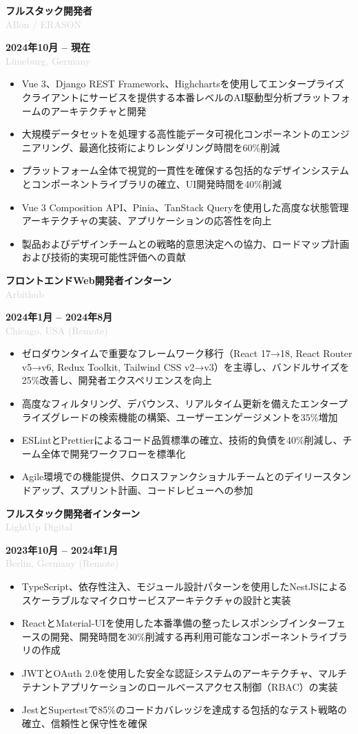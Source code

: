\documentclass[10pt,a4paper]{article}
\newcommand{\Experience}[4]{%
  \vspace{2pt}
  \noindent
  \begin{minipage}[t]{0.70\textwidth}
    {\normalsize\textbf{\color{darkgray}#3}} \\
    \textcolor{lightgray}{\small #1}
  \end{minipage}%
  \hfill
  \begin{minipage}[t]{0.28\textwidth}
    \raggedleft
    \textcolor{mediumgray}{\small\textbf{#4}} \\
    \textcolor{lightgray}{\small #2}
  \end{minipage}
  \vspace{1pt}
}
\begin{document}
\Experience{AIlon / ERASON}{Lüneburg, Germany}{フルスタック開発者}{2024年10月 -- 現在}
\begin{itemize}
  \item Vue 3、Django REST Framework、Highchartsを使用してエンタープライズクライアントにサービスを提供する本番レベルのAI駆動型分析プラットフォームのアーキテクチャと開発
  \item 大規模データセットを処理する高性能データ可視化コンポーネントのエンジニアリング、最適化技術によりレンダリング時間を60\%削減
  \item プラットフォーム全体で視覚的一貫性を確保する包括的なデザインシステムとコンポーネントライブラリの確立、UI開発時間を40\%削減
  \item Vue 3 Composition API、Pinia、TanStack Queryを使用した高度な状態管理アーキテクチャの実装、アプリケーションの応答性を向上
  \item 製品およびデザインチームとの戦略的意思決定への協力、ロードマップ計画および技術的実現可能性評価への貢献
\end{itemize}

\Experience{Arbithub}{Chicago, USA (Remote)}{フロントエンドWeb開発者インターン}{2024年1月 -- 2024年8月}
\begin{itemize}
  \item ゼロダウンタイムで重要なフレームワーク移行（React 17→18, React Router v5→v6, Redux Toolkit, Tailwind CSS v2→v3）を主導し、バンドルサイズを25\%改善し、開発者エクスペリエンスを向上
  \item 高度なフィルタリング、デバウンス、リアルタイム更新を備えたエンタープライズグレードの検索機能の構築、ユーザーエンゲージメントを35\%増加
  \item ESLintとPrettierによるコード品質標準の確立、技術的負債を40\%削減し、チーム全体で開発ワークフローを標準化
  \item Agile環境での機能提供、クロスファンクショナルチームとのデイリースタンドアップ、スプリント計画、コードレビューへの参加
\end{itemize}

\Experience{LightUp Digital}{Berlin, Germany (Remote)}{フルスタック開発者インターン}{2023年10月 -- 2024年1月}
\begin{itemize}
  \item TypeScript、依存性注入、モジュール設計パターンを使用したNestJSによるスケーラブルなマイクロサービスアーキテクチャの設計と実装
  \item ReactとMaterial-UIを使用した本番準備の整ったレスポンシブインターフェースの開発、開発時間を30\%削減する再利用可能なコンポーネントライブラリの作成
  \item JWTとOAuth 2.0を使用した安全な認証システムのアーキテクチャ、マルチテナントアプリケーションのロールベースアクセス制御（RBAC）の実装
  \item JestとSupertestで85\%のコードカバレッジを達成する包括的なテスト戦略の確立、信頼性と保守性を確保
\end{itemize}
\end{document}
